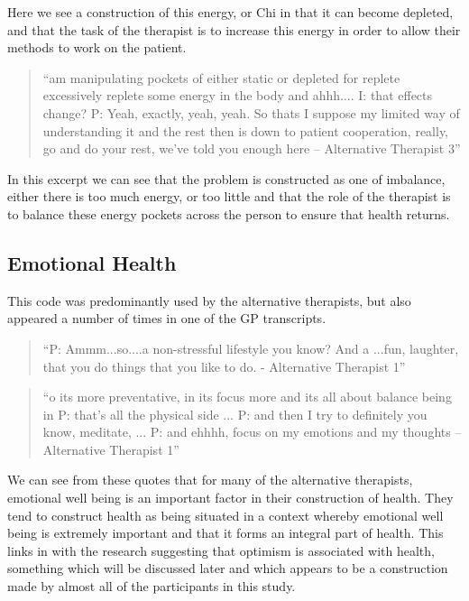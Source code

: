 Here we see a construction of this energy, or Chi in that it can become depleted, and that the task of the therapist is to increase this energy in order to allow their methods to work on the patient. 

\begin{quotation}
``am manipulating pockets of either static or depleted for replete excessively replete some energy in the body and ahhh....
I: that effects change?
P: Yeah, exactly, yeah, yeah. So thats I suppose my limited way of understanding it and the rest then is down to patient cooperation, really, go and do your rest, we've told you enough here – Alternative Therapist 3''  
\end{quotation}


In this excerpt we can see that the problem is constructed as one of imbalance, either there is too much energy, or too little and that the role of the therapist is to balance these energy pockets across the person to ensure that health returns. 



\subsection{Emotional Health}

This code was predominantly used by the alternative therapists, but also appeared a number of times in one of the GP transcripts. 

\begin{quotation}
``P: Ammm...so....a non-stressful lifestyle you know? And a ...fun, laughter, that you do things that you like to do. - Alternative Therapist 1''  
\end{quotation}


\begin{quotation}
``o its more preventative, in its focus more and its all about balance being in
P: that's all the physical side
...
P: and then I try to definitely you know, meditate, 
...
P: and ehhhh, focus on my emotions and my thoughts – Alternative Therapist 1''  
\end{quotation}


We can see from these quotes that for many of the alternative therapists, emotional well being is an important factor in their construction of health. They tend to construct health as being situated in a context whereby emotional well being is extremely important and that it forms an integral part of health. This links in with the research suggesting that optimism is associated with health, something which will be discussed later and which appears to be a construction made by almost all of the participants in this study. 

